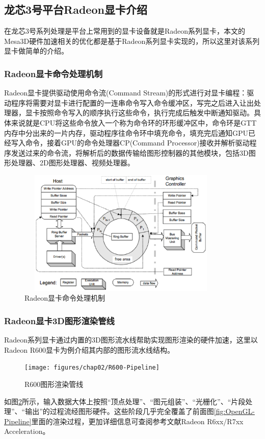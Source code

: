\subsection{龙芯3号平台Radeon显卡介绍}

在龙芯3号系列处理是平台上常用到的显卡设备就是Radeon系列显卡，本文的Mesa3D硬件加速相关的优化都是基于Radeon系列显卡实现的，所以这里对该系列显卡做简单的介绍。

\subsubsection{Radeon显卡命令处理机制}
Radeon显卡提供驱动使用命令流(Command Stream)的形式进行对显卡编程：驱动程序将需要对显卡进行配置的一连串命令写入命令缓冲区，写完之后进入让出处理器，显卡按照命令写入的顺序执行这些命令，执行完成后触发中断通知驱动。具体来说就是CPU将这些命令放入一个称为命令环的环形缓冲区中，命令环是GTT内存中分出来的一片内存，驱动程序往命令环中填充命令，填充完后通知GPU已经写入命令，接着GPU的命令处理器CP(Command Processor)接收并解析驱动程序发送过来的命令流，将解析后的数据传输给图形控制器的其他模块，包括3D图形处理器、2D图形处理器、视频处理器。

\begin{figure}[H] 
  \centering
  \includegraphics[width=10cm,height=6cm]{figures/chap02/CommandBuffer}
  \caption{Radeon显卡命令处理机制}
  \label{fig:CommandBuffer}
\end{figure}

\subsubsection{Radeon显卡3D图形渲染管线}

Radeon系列显卡通过内置的3D图形流水线帮助实现图形渲染的硬件加速，这里以Radeon R600显卡为例介绍其内部的图形流水线结构。

\begin{figure}[H] 
  \centering
  \texttt{[image: figures/chap02/R600-Pipeline]}
  \caption{R600图形渲染管线}
  \label{fig:R600-Pipeline}
\end{figure}

如图\ref{fig:R600-Pipeline}所示，输入数据大体上按照“顶点处理”、“图元组装”、“光栅化”、“片段处理”、“输出”的过程流经图形硬件。这些阶段几乎完全覆盖了前面图\ref{fig:OpenGL-Pipeline}里面的渲染过程，更加详细信息可查阅参考文献Radeon R6xx/R7xx Acceleration\cite{Radeon-Manual}。
